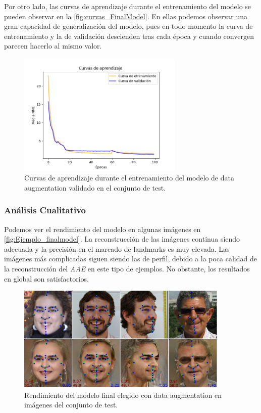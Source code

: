         \medskip

        \noindent Por otro lado, las curvas de aprendizaje durante el entrenamiento del modelo se pueden observar en la \autoref{fig:curvas_FinalModel}. En ellas podemos observar una gran capacidad de generalización del modelo, pues en todo momento la curva de entrenamiento y la de validación descienden tras cada época y cuando convergen parecen hacerlo al mismo valor. 

        \begin{figure}[h]
            \centering
            \includegraphics[width=0.7\textwidth]{img/curvas_FinalModel.png}
            \caption{Curvas de aprendizaje durante el entrenamiento del modelo de data augmentation validado en el conjunto de test.}
            \label{fig:curvas_FinalModel}
        \end{figure}
        
        \newpage
        \subsubsection*{Análisis Cualitativo}

        \noindent Podemos ver el rendimiento del modelo en algunas imágenes en \autoref{fig:Ejemplo_finalmodel}. La reconstrucción de las imágenes continua siendo adecuada y la precisión en el marcado de landmarks es muy elevada. Las imágenes más complicadas siguen siendo las de perfil, debido a la poca calidad de la reconstrucción del \textit{AAE} en este tipo de ejemplos. No obstante, los resultados en global son satisfactorios.

        \begin{figure}[H]
            \centering
            \includegraphics[width=0.9\textwidth]{img/image_finalmodel.png}
            \caption{Rendimiento del modelo final elegido con data augmentation en imágenes del conjunto de test.}
            \label{fig:Ejemplo_finalmodel}
        \end{figure}

